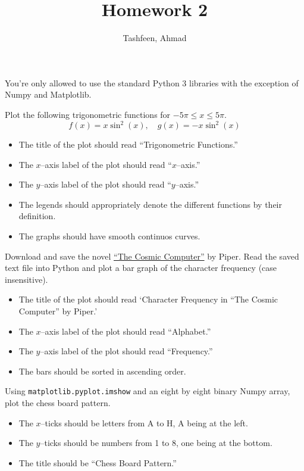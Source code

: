 \documentclass{homework}
\author{Tashfeen, Ahmad}
\title{Homework 2}
\begin{document}
 \maketitle

You're only allowed to use the standard Python 3 libraries with the exception of Numpy and Matplotlib.

\question Plot the following trigonometric functions for $-5\pi \leq x \leq 5\pi$.
\[
  f(x) = x\sin^2(x), \quad  g(x) = -x\sin^2(x)
\]
\begin{itemize}
  \item The title of the plot should read ``Trigonometric Functions.''
  \item The $x$--axis label of the plot should read ``$x$--axis.''
  \item The $y$--axis label of the plot should read ``$y$--axis.''
  \item The legends should appropriately denote the different functions by their definition.
  \item The graphs should have smooth continuos curves.
\end{itemize}

\question Download and save the novel
\href{https://www.gutenberg.org/files/20727/20727.txt}{``The Cosmic
  Computer''} by Piper. Read the saved text file into Python and plot
a bar graph of the character frequency (case insensitive).

\begin{itemize}
  \item The title of the plot should read `Character Frequency in ``The Cosmic Computer'' by Piper.'
  \item The $x$--axis label of the plot should read ``Alphabet.''
  \item The $y$--axis label of the plot should read ``Frequency.''
  \item The bars should be sorted in ascending order.
\end{itemize}

\question Using \texttt{matplotlib.pyplot.imshow} and an eight by eight binary Numpy array, plot the chess board pattern.

\begin{itemize}
  \item The $x$--ticks should be letters from A to H, A being at the left.
  \item The $y$--ticks should be numbers from 1 to 8, one being at the bottom.
  \item The title should be ``Chess Board Pattern.''
\end{itemize}
\end{document}
